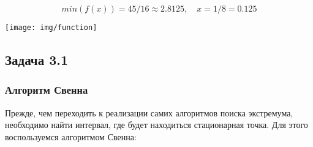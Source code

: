 \documentclass[a4paper, 12pt]{article}   	%
\begin{document}
     \begin{equation}
        min(f(x)) = 45/16 \approx 2.8125,\quad x = 1/8 = 0.125 
    \end{equation}
    
    \begin{center}
        \begin{minipage}{0.7\linewidth}
            \texttt{[image: img/function]}
        \end{minipage}
    \end{center}
    
\subsection{Задача 3.1}

\subsubsection{Алгоритм Свенна}
    Прежде, чем переходить к реализации самих алгоритмов поиска экстремума, необходимо найти интервал, где будет находиться стационарная точка. Для этого воспользуемся алгоритмом Свенна:
    
\end{document}

